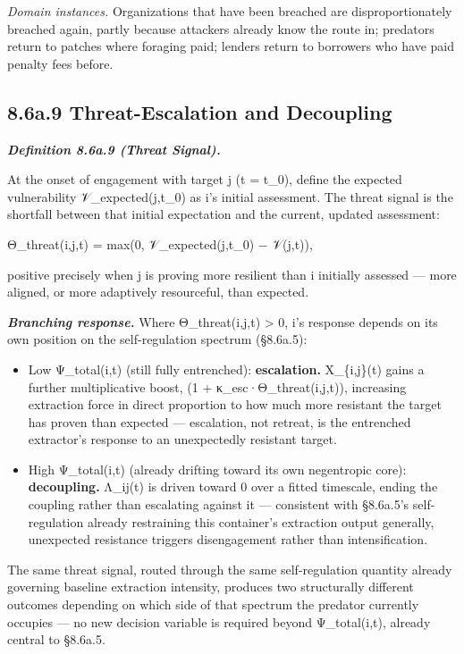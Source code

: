 \documentclass[
]{article}
\begin{document}
\emph{Domain instances.} Organizations that have been breached are
disproportionately breached again, partly because attackers already know
the route in; predators return to patches where foraging paid; lenders
return to borrowers who have paid penalty fees before.

\hypertarget{a.9-threat-escalation-and-decoupling}{%
\subsection{8.6a.9 Threat-Escalation and
Decoupling}\label{a.9-threat-escalation-and-decoupling}}

\emph{\textbf{Definition 8.6a.9 (Threat Signal).}}

At the onset of engagement with target j (t = t\_0), define the expected
vulnerability 𝒱\_expected(j,t\_0) as i's initial assessment. The threat
signal is the shortfall between that initial expectation and the
current, updated assessment:

Θ\_threat(i,j,t) = max(0, 𝒱\_expected(j,t\_0) − 𝒱(j,t)),

positive precisely when j is proving more resilient than i initially
assessed --- more aligned, or more adaptively resourceful, than
expected.

\emph{\textbf{Branching response.}} Where Θ\_threat(i,j,t)
\textgreater{} 0, i's response depends on its own position on the
self-regulation spectrum (§8.6a.5):

\begin{itemize}
\item
  Low Ψ\_total(i,t) (still fully entrenched): \textbf{escalation.}
  X\_\{i,j\}(t) gains a further multiplicative boost, (1 +
  κ\_esc·Θ\_threat(i,j,t)), increasing extraction force in direct
  proportion to how much more resistant the target has proven than
  expected --- escalation, not retreat, is the entrenched extractor's
  response to an unexpectedly resistant target.
\item
  High Ψ\_total(i,t) (already drifting toward its own negentropic core):
  \textbf{decoupling.} Λ\_ij(t) is driven toward 0 over a fitted
  timescale, ending the coupling rather than escalating against it ---
  consistent with §8.6a.5's self-regulation already restraining this
  container's extraction output generally, unexpected resistance
  triggers disengagement rather than intensification.
\end{itemize}

The same threat signal, routed through the same self-regulation quantity
already governing baseline extraction intensity, produces two
structurally different outcomes depending on which side of that spectrum
the predator currently occupies --- no new decision variable is required
beyond Ψ\_total(i,t), already central to §8.6a.5.
\end{document}
